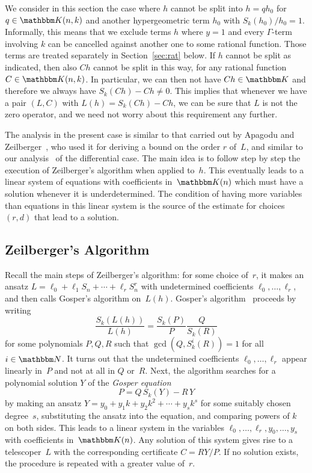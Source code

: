 \documentclass{sig-alternate}
\let\set\mathbbm
\def\K{\set K}
\begin{document}
We consider in this section the case where $h$ cannot be split into $h=q h_0$
for $q\in\K(n,k)$ and another hypergeometric term $h_0$ with
$S_k(h_0)/h_0=1$. Informally, this means that we exclude terms $h$ where $y=1$
and every $\Gamma$-term involving $k$ can be cancelled against another one to
some rational function. Those terms are treated separately in
Section~\ref{sec:rat} below.  If $h$ cannot be split as indicated, then also
$Ch$ cannot be split in this way, for any rational function $C\in\K(n,k)$. In
particular, we can then not have $Ch\in\K$ and therefore we always have
$S_k(Ch)-Ch\neq0$. This implies that whenever we have a pair $(L,C)$ with
$L(h)=S_k(Ch)-Ch$, we can be sure that $L$ is not the zero operator, and we need
not worry about this requirement any further.

The analysis in the present case is similar to that carried out by
Apagodu and Zeilberger~\cite{mohammed05}, who used it for deriving a bound on the order
$r$ of~$L$, and similar to our analysis~\cite{chen11} of the differential case.
The main idea is to follow step by step the execution of Zeilberger's
algorithm when applied to~$h$. This eventually leads to a linear system of
equations with coefficients in~$\K(n)$ which must have a solution whenever it is
underdetermined. The condition of having more variables than equations in this
linear system is the source of the estimate for choices $(r,d)$ that lead
to a solution.

\subsection{Zeilberger's Algorithm}

Recall the main steps of Zeilberger's algorithm: for some choice of~$r$, it makes
an ansatz $L=\ell_0+\ell_1 S_n+\cdots+\ell_r S_n^r$ with undetermined coefficients
$\ell_0,\dots,\ell_r$, and then calls Gosper's algorithm on~$L(h)$.
Gosper's algorithm~\cite{gosper78} proceeds by writing
\[
  \frac{S_k(L(h))}{L(h)}=\frac{S_k(P)}{P} \frac{Q}{S_k(R)}
\]
for some polynomials $P,Q,R$ such that $\gcd(Q,S_k^i(R))=1$ for all $i\in\set N$. It
turns out that the undetermined coefficients $\ell_0,\dots,\ell_r$ appear
linearly in~$P$ and not at all in $Q$ or~$R$. Next, the algorithm searches for
a polynomial solution $Y$ of the \emph{Gosper equation}
\[
  P = Q\,S_k(Y) - R\,Y
\]
by making an ansatz $Y=y_0+y_1k+y_2k^2+\cdots+y_sk^s$ for some suitably chosen
degree~$s$, substituting the ansatz into the equation, and comparing powers of $k$
on both sides. This leads to a linear system in the variables
$\ell_0,\dots,\ell_r,y_0,\dots,y_s$ with coefficients in~$\K(n)$. Any solution
of this system gives rise to a telescoper~$L$ with the corresponding certificate $C=RY/P$.
If no solution exists, the procedure is repeated with a greater value
of~$r$.
\end{document}
